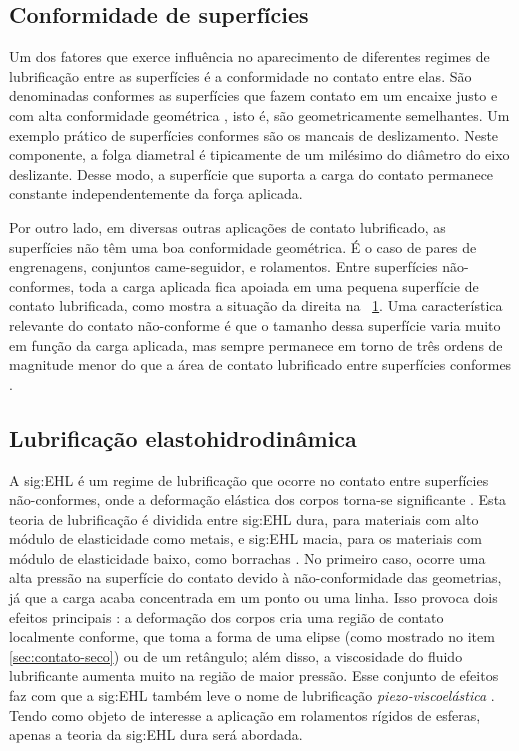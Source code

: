 \documentclass[12pt,oneside,english,brazil,lmodern,siglas,simbolos,cite=num]{ucsmonograph}
\begin{document}
	\subsection{Conformidade de superfícies}
	Um dos fatores que exerce influência no aparecimento de diferentes regimes de lubrificação entre as superfícies é a conformidade no contato entre elas.
	São denominadas conformes as superfícies que fazem contato em um encaixe justo e com alta conformidade geométrica \cite{hamrock:1991}, isto é, são geometricamente semelhantes.
	Um exemplo prático de superfícies conformes são os mancais de deslizamento.
	Neste componente, a folga diametral é tipicamente de um milésimo do diâmetro do eixo deslizante.
	Desse modo, a superfície que suporta a carga do contato permanece constante independentemente da força aplicada.
	
	Por outro lado, em diversas outras aplicações de contato lubrificado, as superfícies não têm uma boa conformidade geométrica.
	É o caso de pares de engrenagens, conjuntos came-seguidor, e rolamentos.
	Entre superfícies não-conformes, toda a carga aplicada fica apoiada em uma pequena superfície de contato lubrificada, como mostra a situação da direita na \figurename\ \ref{fig:contato-conforme}.
	Uma característica relevante do contato não-conforme é que o tamanho dessa superfície varia muito em função da carga aplicada, mas sempre permanece em torno de três ordens de magnitude menor do que a área de contato lubrificado entre superfícies conformes \cite{hamrock:1991}.
	
	\begin{figure}[b]
		\label{fig:contato-conforme}
	\end{figure}
	
	\subsection{Lubrificação elastohidrodinâmica}
	A \gls{sig:EHL} é um regime de lubrificação que ocorre no contato entre superfícies não-conformes, onde a deformação elástica dos corpos torna-se significante \cite{spikes:2006}.
	Esta teoria de lubrificação é dividida entre \gls{sig:EHL} dura, para materiais com alto módulo de elasticidade como metais, e \gls{sig:EHL} macia, para os materiais com módulo de elasticidade baixo, como borrachas \cite{hamrock:1991}.
	No primeiro caso, ocorre uma alta pressão na superfície do contato devido à não-conformidade das geometrias, já que a carga acaba concentrada em um ponto ou uma linha.
	Isso provoca dois efeitos principais \cite{spikes:2006}: a deformação dos corpos cria uma região de contato localmente conforme, que toma a forma de uma elipse (como mostrado no item \ref{sec:contato-seco}) ou de um retângulo;
	além disso, a viscosidade do fluido lubrificante aumenta muito na região de maior pressão.
	Esse conjunto de efeitos faz com que a \gls{sig:EHL} também leve o nome de lubrificação \emph{piezo-viscoelástica} \cite{spikes:2006}.
	Tendo como objeto de interesse a aplicação em rolamentos rígidos de esferas, apenas a teoria da \gls{sig:EHL} dura será abordada.
	
\end{document}
